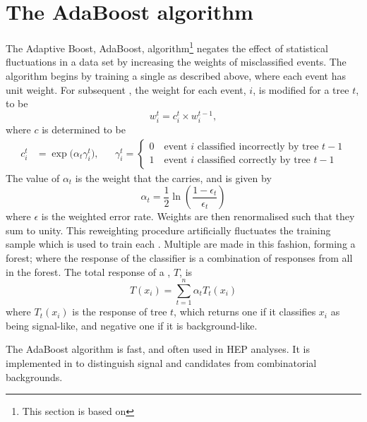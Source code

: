 \section{The AdaBoost algorithm}
\label{sec:bdt:ada}
The Adaptive Boost, AdaBoost, algorithm\footnote{
  This section is based on } negates the effect of statistical
fluctuations in a data set by increasing the weights of misclassified events.
The algorithm begins by training a single \DT as described above, where each event has unit weight.
For subsequent \DTs, the weight for each event, $i$, is modified for a tree $t$, to be
\begin{equation}
  w_i^t = c_i^t \times w_i^{t-1},
  \label{eq:ada:wt}
\end{equation}
where $c$ is determined to be
\begin{align}
  c_i^t &= \exp\big(\alpha_t\gamma_i^t\big),
  &&
  \gamma_i^t=\left\{
    \begin{array}{l}
      0\quad\text{event $i$ classified incorrectly by tree $t-1$} \\
      1\quad\text{event $i$ classified correctly by tree $t-1$}
    \end{array}
  \right.
\end{align}
The value of $\alpha_t$ is the weight that the \DT carries, and is given by
\begin{equation}
  \alpha_t = \frac12\ln\left(\frac{1-\epsilon_t}{\epsilon_t}\right)
\end{equation}
where $\epsilon$ is the weighted error rate.
Weights are then renormalised such that they sum to unity.
This reweighting procedure artificially fluctuates the training sample which is used to train
each \DT.
Multiple \DTs are made in this fashion, forming a forest; where the response of the \BDT classifier
is a combination of responses from all \DTs in the forest.
The total response of a \BDT, $T$, is
\begin{equation}
  T(x_i) = \sum_{t=1}^{n} \alpha_tT_t(x_i)
  \label{eq:ada:fullbdt}
\end{equation}
where $T_t(x_i)$ is the response of tree $t$, which returns one if it classifies $x_i$ as being
signal-like, and negative one if it is background-like.

The AdaBoost algorithm is fast, and often used in \gls{HEP} analyses.
It is implemented in  to distinguish signal \btokpipimumu and \btophikmumu candidates
from combinatorial backgrounds.



